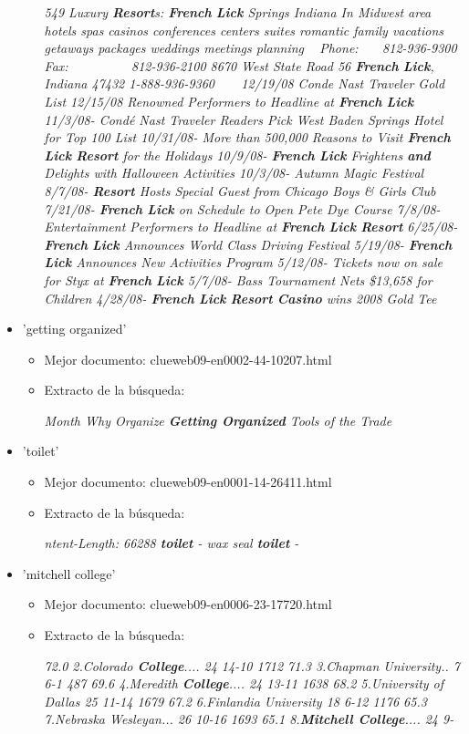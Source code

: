 \documentclass[palatino,nochap]{apuntes}
\begin{document}
\begin{itemize}
\begin{itemize}
		\textit{549 Luxury \textbf{Resort}s: \textbf{French} \textbf{Lick} Springs Indiana In Midwest area hotels spas casinos conferences centers suites romantic family vacations getaways packages weddings meetings planning   Phone:    812-936-9300 Fax:          812-936-2100 8670 West State Road 56 \textbf{French} \textbf{Lick}, Indiana 47432 1-888-936-9360     12/19/08 Conde Nast Traveler Gold List 12/15/08 Renowned Performers to Headline at \textbf{French} \textbf{Lick} 11/3/08- Condé Nast Traveler Readers Pick West Baden Springs Hotel for Top 100 List 10/31/08- More than 500,000 Reasons to Visit \textbf{French} \textbf{Lick} \textbf{Resort} for the Holidays 10/9/08- \textbf{French} \textbf{Lick} Frightens \textbf{and} Delights with Halloween Activities 10/3/08- Autumn Magic Festival 8/7/08- \textbf{Resort} Hosts Special Guest from Chicago Boys \& Girls Club 7/21/08- \textbf{French} \textbf{Lick} on Schedule to Open Pete Dye Course 7/8/08- Entertainment Performers to Headline at \textbf{French} \textbf{Lick} \textbf{Resort} 6/25/08- \textbf{French} \textbf{Lick} Announces World Class Driving Festival 5/19/08- \textbf{French} \textbf{Lick} Announces New Activities Program 5/12/08- Tickets now on sale for Styx at \textbf{French} \textbf{Lick} 5/7/08- Bass Tournament Nets \$13,658 for Children 4/28/08- \textbf{French} \textbf{Lick} \textbf{Resort} \textbf{Casino} wins 2008 Gold Tee }
	\end{itemize}
	\item 'getting organized'
	\begin{itemize}
		\item Mejor documento: clueweb09-en0002-44-10207.html
		\item Extracto de la búsqueda:
		
		\textit{Month Why Organize \textbf{Getting Organized} Tools of the Trade}
	\end{itemize}
	\item 'toilet'
	\begin{itemize}
		\item Mejor documento: clueweb09-en0001-14-26411.html
		\item Extracto de la búsqueda:
		
		\textit{ntent-Length: 66288 \textbf{toilet} - wax seal \textbf{toilet} -}
	\end{itemize}
	\item 'mitchell college'
	\begin{itemize}
		\item Mejor documento: clueweb09-en0006-23-17720.html
		\item Extracto de la búsqueda:
		
		\textit{72.0
			2.Colorado \textbf{College}.... 24  14-10 1712  71.3
			3.Chapman University..  7   6-1   487  69.6
			4.Meredith \textbf{College}.... 24  13-11 1638  68.2
			5.University of Dallas 25  11-14 1679  67.2
			6.Finlandia University 18   6-12 1176  65.3
			7.Nebraska Wesleyan... 26  10-16 1693  65.1
			8.\textbf{Mitchell College}.... 24   9-}
	\end{itemize}
\end{itemize}
\end{document}
